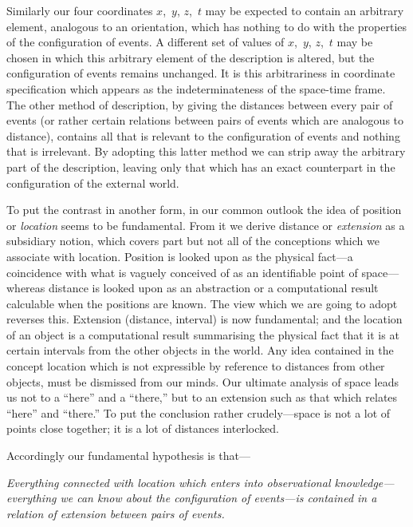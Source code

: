 \documentclass[12pt]{book}
\begin{document}
Similarly our four coordinates $x$,~$y$, $z$,~$t$ may be expected to contain an
arbitrary element, analogous to an orientation, which has nothing to do with
the properties of the configuration of events. A different set of values of
$x$,~$y$, $z$,~$t$ may be chosen in which this arbitrary element of the description is
altered, but the configuration of events remains unchanged. It is this
arbitrariness in coordinate specification which appears as the indeterminateness
of the space-time frame. The other method of description, by giving the
distances between every pair of events (or rather certain relations between
pairs of events which are analogous to distance), contains all that is relevant
to the configuration of events and nothing that is irrelevant. By adopting
this latter method we can strip away the arbitrary part of the description,
leaving only that which has an exact counterpart in the configuration of the
external world.

To put the contrast in another form, in our common outlook the idea of
%
%
position or \emph{location} seems to be fundamental. From it we derive distance or
\emph{extension} as a subsidiary notion, which covers part but not all of the conceptions
which we associate with location. Position is looked upon as the
physical fact---a coincidence with what is vaguely conceived of as an
identifiable point of space---whereas distance is looked upon as an abstraction
or a computational result calculable when the positions are known. The view
which we are going to adopt reverses this. Extension (distance, interval) is
now fundamental; and the location of an object is a computational result
summarising the physical fact that it is at certain intervals from the other
objects in the world. Any idea contained in the concept location which is not
expressible by reference to distances from other objects, must be dismissed
from our minds. Our ultimate analysis of space leads us not to a ``here'' and
a ``there,'' but to an extension such as that which relates ``here'' and ``there.''
To put the conclusion rather crudely---space is not a lot of points close
together; it is a lot of distances interlocked.

Accordingly our fundamental hypothesis is that---

\emph{Everything connected with location which enters into observational knowledge---everything
we can know about the configuration of events---is contained
%
in a relation of extension between pairs of events.}
\end{document}
